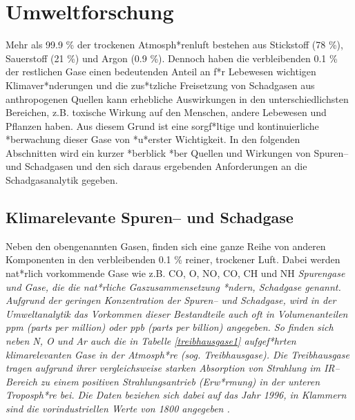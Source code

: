 \chapter{\label{umwelt}Umweltforschung}

Mehr als 99.9 \% der trockenen Atmosph*renluft bestehen aus
Stickstoff (78 \%), Sauerstoff (21 \%) und Argon (0.9 \%). Dennoch
haben die verbleibenden 0.1 \% der restlichen Gase einen
bedeutenden Anteil an f*r Lebewesen wichtigen Klimaver*nderungen
und die zus*tzliche Freisetzung von Schadgasen aus anthropogenen
Quellen kann erhebliche Auswirkungen in den unterschiedlichsten
Bereichen, z.B. toxische Wirkung auf den Menschen, andere
Lebewesen und Pflanzen haben. Aus diesem Grund ist eine
sorgf*ltige und kontinuierliche *berwachung dieser Gase von
*u*erster Wichtigkeit. In den folgenden Abschnitten wird ein
kurzer *berblick *ber Quellen und Wirkungen von Spuren-- und
Schadgasen und den sich daraus ergebenden Anforderungen an die
Schadgasanalytik gegeben.


\section{\label{atmosph*re}Klimarelevante Spuren-- und Schadgase}

Neben den obengenannten Gasen, finden sich eine ganze Reihe von
anderen Komponenten in den verbleibenden 0.1 \% reiner, trockener
Luft. Dabei werden nat*rlich vorkommende Gase wie z.B. CO,
O, NO, CO, CH und NH \it
Spurengase \rm und Gase, die die nat*rliche Gaszusammensetzung
*ndern, \it Schadgase \rm genannt. Aufgrund der geringen
Konzentration der Spuren-- und Schadgase, wird in der
Umweltanalytik das Vorkommen dieser Bestandteile auch oft in
Volumenanteilen ppm (parts per million) oder ppb (parts per
billion) angegeben. So finden sich neben N, O und
Ar auch die in Tabelle \ref{treibhausgase1} aufgef*hrten
klimarelevanten Gase in der Atmosph*re (sog. \it
Treib\-haus\-ga\-se\rm ). Die Treibhausgase tragen aufgrund ihrer
vergleichsweise starken Absorption von Strahlung im IR--Bereich zu
einem positiven Strahlungsantrieb (Erw*rmung) in der unteren
Troposph*re bei. Die Daten beziehen sich dabei auf das Jahr 1996,
in Klammern sind die vorindustriellen Werte von 1800 angegeben
\cite{schoenwiese99}.\\


